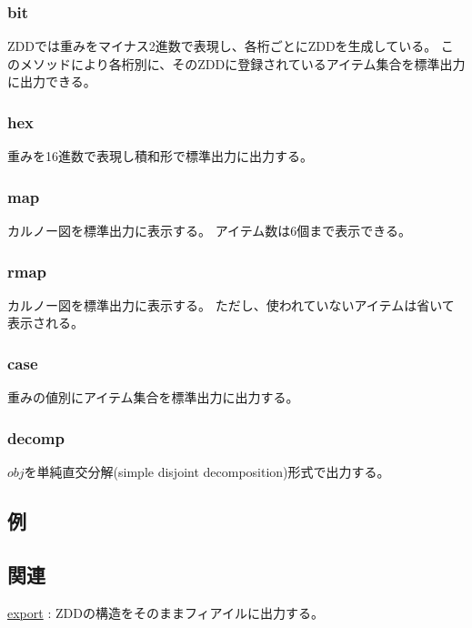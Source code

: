 \subsubsection*{bit}
ZDDでは重みをマイナス2進数で表現し、各桁ごとにZDDを生成している。
このメソッドにより各桁別に、そのZDDに登録されているアイテム集合を標準出力に出力できる。
\subsubsection*{hex}
重みを16進数で表現し積和形で標準出力に出力する。
\subsubsection*{map}
カルノー図を標準出力に表示する。
アイテム数は6個まで表示できる。
\subsubsection*{rmap}
カルノー図を標準出力に表示する。
ただし、使われていないアイテムは省いて表示される。
\subsubsection*{case}
重みの値別にアイテム集合を標準出力に出力する。
\subsubsection*{decomp}
$obj$を単純直交分解(simple disjoint decomposition)形式で出力する。
\fi

\subsection*{例}


\subsection*{関連}
\hyperref[sect:export]{export} : ZDDの構造をそのままフィアイルに出力する。
